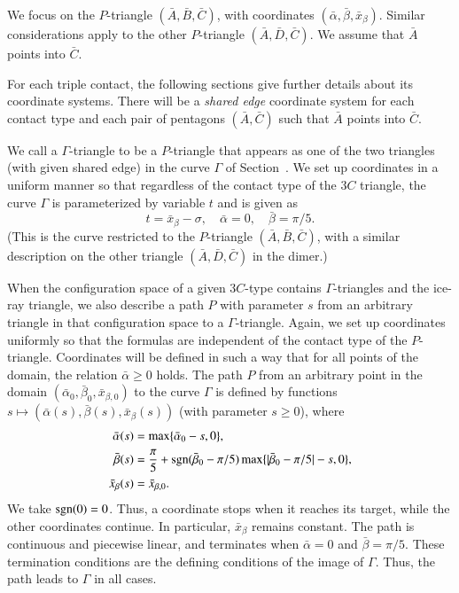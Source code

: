 We focus on the $P$-triangle $(\bar A,\bar B,\bar C)$, with
coordinates $(\bar\alpha,\bar\beta,\bar x_\beta)$.  Similar
considerations apply to the other $P$-triangle $(\bar A,\bar D,\bar
C)$.  We assume that $\bar A$ points into $\bar C$.

For each triple contact, the following sections give further details
about its coordinate systems.  There will be a {\it shared edge}
coordinate system for each contact type and each pair of pentagons
$(\bar A,\bar C)$ such that $\bar A$ points into $\bar C$.

We call a $\Gamma$-triangle to be a $P$-triangle that appears as one
of the two triangles (with given shared edge) in the curve $\Gamma$ of
Section~.  We set up coordinates in a uniform manner so
that regardless of the contact type of the $3C$ triangle, the curve
$\Gamma$ is parameterized by variable $t$ and is given as
\[
t = \bar x_\beta  -\sigma, \quad
\bar\alpha = 0,\quad
\bar\beta = \pi/5.
\]
(This is the curve restricted to the $P$-triangle $(\bar A,\bar B,\bar
C)$, with a similar description on the other triangle $(\bar A,\bar
D,\bar C)$ in the dimer.)

When the configuration space of a given $3C$-type contains
$\Gamma$-triangles and the ice-ray triangle, we also describe a path
$P$ with parameter $s$ from an arbitrary triangle in that
configuration space to a $\Gamma$-triangle.  Again, we set up
coordinates uniformly so that the formulas are independent of the
contact type of the $P$-triangle.  Coordinates will be defined in such
a way that for all points of the domain, the relation $\bar\alpha\ge
0$ holds.  The path $P$ from an arbitrary point in the domain
$(\bar\alpha_0,\bar\beta_0,\bar x_{\beta,0})$ to the curve $\Gamma$ is
defined by functions $s\mapsto (\bar\alpha(s),\bar\beta(s),\bar
x_\beta(s))$ (with parameter $s\ge 0$), where
\begin{align*}
\bar\alpha(s)&=\max\{\bar\alpha_0-s,0\},\\
\bar\beta(s)&=\frac\pi5+\op{sgn}(\bar\beta_0-\pi/5)
                  \max\{|\bar\beta_0-\pi/5|-s,0\},\\ %
\bar x_\beta(s)&=\bar x_{\beta,0}.
\end{align*}
We take ${\operatorname{sgn}}(0)=0$.  Thus, a coordinate stops when it reaches
its target, while the other coordinates continue.  In particular,
$\bar x_\beta$ remains constant.  The path is continuous and
piecewise linear, and terminates when $\bar\alpha=0$ and
$\bar\beta=\pi/5$.  These
termination conditions are the defining conditions of the image of
$\Gamma$.  Thus, the path leads to $\Gamma$ in all cases.

